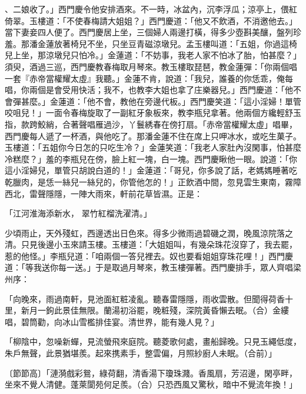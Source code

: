 、二娘收了。」西門慶令他安排酒來。不一時，冰盆內，沉李浮瓜；涼亭上，偎紅倚翠。玉樓道：「不使春梅請大姐姐？」西門慶道：「他又不飲酒，不消邀他去。」當下妻妾四人便了。西門慶居上坐，三個婦人兩邊打橫，得多少壺斟美釀，盤列珍羞。那潘金蓮放著椅兒不坐，只坐豆青磁涼墩兒。孟玉樓叫道：「五姐，你過這椅兒上坐，那涼墩兒只怕冷。」金蓮道：「不妨事，我老人家不怕冰了胎，怕甚麼？」須臾，酒過三巡，西門慶教春梅取月琴來。教玉樓取琵琶，教金蓮彈：「你兩個唱一套『赤帝當權耀太虛』我聽。」金蓮不肯，說道：「我兒，誰養的你恁乖，俺每唱，你兩個是會受用快活；我不，也教李大姐也拿了庄樂器兒。」西門慶道：「他不會彈甚麼。」金蓮道：「他不會，教他在旁邊代板。」西門慶笑道：「這小淫婦！單管咬咀兒！」一面令春梅旋取了一副紅牙象板來，教李瓶兒拿著。他兩個方纔輕舒玉指，款跨鮫綃，合著聲唱雁過沙，丫鬟綉春在傍打扇。「赤帝當權耀太虛」唱畢，西門慶每人遞了一杯酒，與他吃了。那潘金蓮不住在席上只呷冰水，或吃生菓子。玉樓道：「五姐你今日怎的只吃生冷？」金蓮笑道：「我老人家肚內沒閑事，怕甚麼冷糕麼？」羞的李瓶兒在傍，臉上紅一塊，白一塊。西門慶瞅他一眼。說道：「你這小淫婦兒，單管只胡說白道的！」金蓮道：「哥兒，你多說了話，老媽媽睡著吃乾臘肉，是恁一絲兒一絲兒的，你管他怎的！」正飲酒中間，忽見雲生東南，霧障西北，雷聲隱隱，一陣大雨來，軒前花草皆濕。正是：

「江河淮海添新水，  翠竹紅榴洗濯清。」

少頃雨止，天外殘虹，西邊透出日色來。得多少微雨過碧磯之潤，晚風涼院落之清。只見後邊小玉來請玉樓。玉樓道：「大姐姐叫，有幾朵珠花沒穿了，我去罷，惹的他怪。」李瓶兒道：「咱兩個一答兒裡去。奴也要看姐姐穿珠花哩！」西門慶道：「等我送你每一送。」于是取過月琴來，教玉樓彈著。西門慶排手，眾人齊唱梁州序：

「向晚來，雨過南軒，見池面紅粧凌亂。聽春雷隱隱，雨收雲散。但聞得荷香十里，新月一鉤此景佳無限。蘭湯初浴罷，晚粧殘，深院黃昏懶去眠。（合）金縷唱，碧筒勸，向冰山雪檻排佳宴。清世界，能有幾人見？」

「柳陰中，忽噪新蟬，見流螢飛來庭院。聽菱歌何處，畫船歸晚。只見玉繩低度，朱戶無聲，此景猶堪羨。起來携素手，整雲偏，月照紗廚人未眠。（合前）」

〔節節高〕「漣漪戲彩鴛，綠荷翻，清香湯下瓊珠濺。香風扇，芳沼邊，閑亭畔，坐來不覺人清健。蓬萊閬苑何足羨。（合）只恐西風又驚秋，暗中不覺流年換！」

